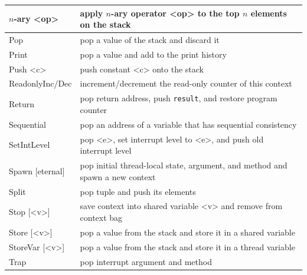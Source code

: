 \documentclass{report}
\begin{document}
{\begin{tabular}{|l|l|}
\hline
$n$-ary <{op}> & apply $n$-ary operator <{op}> to the top $n$ elements on the stack \\
\hline
Pop & pop a value of the stack and discard it \\
\hline
Print & pop a value and add to the print history \\
\hline
Push <{c}> & push constant <{c}> onto the stack \\
\hline
ReadonlyInc/Dec & increment/decrement the read-only counter of this context \\
\hline
Return & pop return address, push \texttt{result}, and restore program counter \\
\hline
Sequential & pop an address of a variable that has sequential consistency \\
\hline
SetIntLevel & pop <{e}>, set interrupt level to <{e}>, and push old interrupt level \\
\hline
Spawn [eternal] & pop initial thread-local state, argument, and method and spawn a new context \\
\hline
Split & pop tuple and push its elements \\
\hline
Stop [<{v}>] & save context into shared variable <{v}> and remove from context bag \\
\hline
Store [<{v}>] & pop a value from the stack and store it in a shared variable \\
\hline
StoreVar [<{v}>] & pop a value from the stack and store it in a thread variable \\
\hline
Trap & pop interrupt argument and method \\
\hline
\end{tabular}
}
\end{document}
